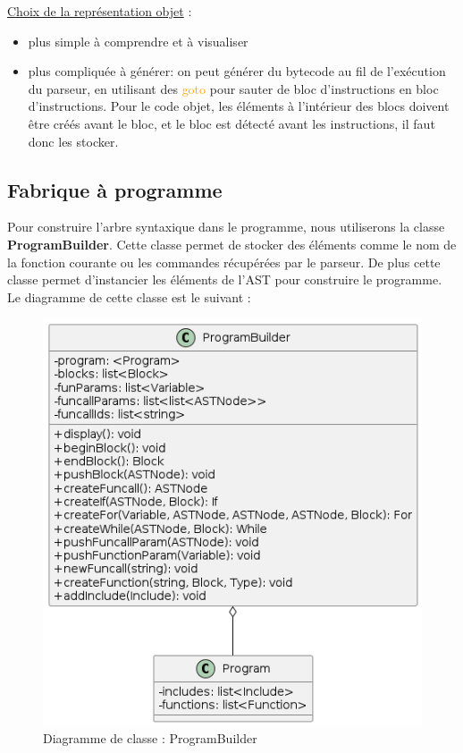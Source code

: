 \documentclass[a4paper]{article}%
\begin{document}
\underline{Choix de la représentation objet} :
\begin{itemize}
\item plus simple à comprendre et à visualiser
\item plus compliquée à générer: on peut générer du bytecode au fil de
  l'exécution du parseur, en utilisant des \textcolor{orange}{goto} pour
    sauter de bloc d'instructions en bloc d'instructions. Pour le code objet,
    les éléments à l'intérieur des blocs doivent être créés avant le bloc, et
    le bloc est détecté avant les instructions, il faut donc les stocker.
\end{itemize}


\clearpage{}

\subsection{Fabrique à programme}\label{sec:fabprog}

Pour construire l'arbre syntaxique dans le programme, nous utiliserons
la classe \textbf{ProgramBuilder}. Cette classe permet de stocker des éléments
comme le nom de la fonction courante ou les commandes récupérées par le
parseur.
De plus cette classe permet d'instancier les éléments de l'AST pour construire
le programme. Le diagramme de cette classe est le suivant :

\begin{figure}[h]
  \begin{center}
  \includegraphics[scale=0.5]{../ressources/diagrams/program-builder.png}
  \caption{Diagramme de classe : ProgramBuilder}
  \end{center}
\end{figure}
\end{document}
